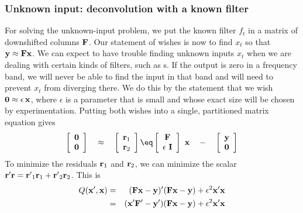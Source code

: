 \subsubsection{Unknown input: deconvolution with a known filter}
For solving the unknown-input problem,
we put the known filter $f_t$ in a matrix of downshifted columns $\bold F$.
Our statement of wishes is now to find $x_t$ so that
$\bold y \approx \bold F \bold x$.
We can expect to have trouble finding unknown inputs $x_t$
when we are dealing with certain kinds of filters,
such as s.
If the output is zero in a frequency band,
we will never be able to find the input in that band
and will need to prevent $x_t$ from diverging there.
We do this by the statement that we wish
$\bold 0\approx\epsilon\,\bold x$,
where $\epsilon$ is a parameter that is small
and whose exact size will be chosen by experimentation.
Putting both wishes into a single, partitioned matrix equation gives
\begin{equation}
 \left[ 
  \begin{array}{c}
   \bold 0 \\ 
   \bold 0
  \end{array}
 \right] 
\quad\approx\quad
 \left[ 
  \begin{array}{c}
   \bold r_1 \\ 
   \bold r_2
  \end{array}
 \right] 
\eq
 \left[ 
  \begin{array}{c}
   \bold F \\ 
   \epsilon \  \bold I
  \end{array}
 \right] 
 \ 
 \bold x
\quad - \quad
 \left[ 
  \begin{array}{c}
   \bold y \\ 
   \bold 0
  \end{array}
 \right] 
\end{equation}
To minimize the residuals $\bold r_1$ and $\bold r_2$,
we can minimize the scalar
$\bold r' \bold r = \bold {r'}_1\bold r_1 + \bold {r'}_2\bold r_2$.
This is
\begin{eqnarray}
Q(\bold x', \bold x) &=& (\bold F  \bold x  - \bold y)' (\bold F\bold x-\bold y)
                                        + \epsilon^2 \bold x' \bold x
                                                                \nonumber \\
                     &=& (\bold x' \bold F' - \bold y') (\bold F\bold x-\bold y)
                                        + \epsilon^2 \bold x' \bold x
\label{eqn:knownfilt}
\end{eqnarray}
